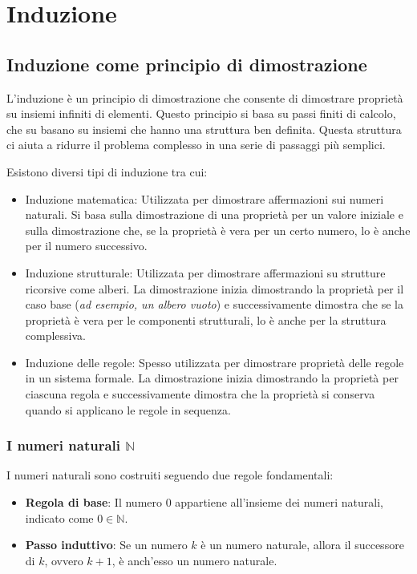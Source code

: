 \chapter{Induzione}
\section{Induzione come principio di dimostrazione}
L'induzione è un principio di dimostrazione che consente di dimostrare proprietà su insiemi infiniti di elementi.
Questo principio si basa su passi finiti di calcolo, che su basano su insiemi che hanno una struttura ben definita.
Questa struttura ci aiuta a ridurre il problema complesso in una serie di passaggi più semplici.

Esistono diversi tipi di induzione tra cui:

\begin{itemize}
  \item Induzione matematica: Utilizzata per dimostrare affermazioni sui numeri naturali.
  Si basa sulla dimostrazione di una proprietà per un valore iniziale e sulla dimostrazione che,
  se la proprietà è vera per un certo numero, lo è anche per il numero successivo.

  \item Induzione strutturale: Utilizzata per dimostrare affermazioni su strutture ricorsive come
  alberi. La dimostrazione inizia dimostrando la proprietà per il caso base (\textit{ad esempio, un albero vuoto})
  e successivamente dimostra che se la proprietà è vera per le componenti strutturali, lo è anche per la struttura complessiva.

  \item Induzione delle regole: Spesso utilizzata per dimostrare proprietà delle regole in un sistema formale.
  La dimostrazione inizia dimostrando la proprietà per ciascuna regola e successivamente dimostra che la proprietà
  si conserva quando si applicano le regole in sequenza.
\end{itemize}

\subsection{I numeri naturali $\mathbb{N}$}
I numeri naturali sono costruiti seguendo due regole fondamentali:

\begin{itemize}
  \item \textbf{Regola di base}: Il numero $0$ appartiene all'insieme dei
  numeri naturali, indicato come $0 \in \mathbb{N}$.

  \item \textbf{Passo induttivo}: Se un numero $k$ è un
  numero naturale, allora il successore di $k$, ovvero $k+1$,
  è anch'esso un numero naturale.
\end{itemize}

